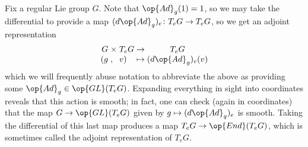 \documentclass[../notes.tex]{subfiles}
\begin{document}
\begin{example}[adjoint] \label{ex:adjoint}
	Fix a regular Lie group $G$. Note that $\op{Ad}_g(1)=1$, so we may take the differential to provide a map $(d\op{Ad}_g)_e\colon T_eG\to T_eG$, so we get an adjoint representation
	\[\arraycolsep=1.4pt\begin{array}{rllcc}
		G &\times& T_eG &\to& T_eG \\
		(g &,& v) &\mapsto& (d\op{Ad}_g)_e(v)
	\end{array}\]
	which we will frequently abuse notation to abbreviate the above as providing some $\op{Ad}_g\in\op{GL}(T_eG)$. Expanding everything in sight into coordinates reveals that this action is smooth; in fact, one can check (again in coordinates) that the map $G\to\op{GL}(T_eG)$ given by $g\mapsto(d\op{Ad}_g)_e$ is smooth. Taking the differential of this last map produces a map $T_eG\to\op{End}(T_eG)$, which is sometimes called the adjoint representation of $T_eG$.
\end{example}
\end{document}
